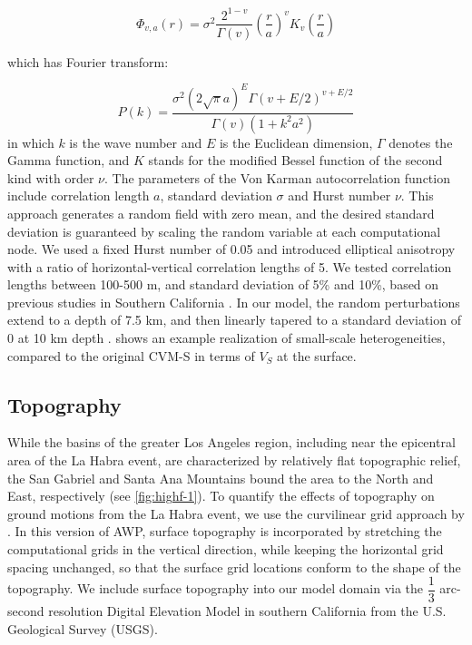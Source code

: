 \begin{equation}\label{eq:highf-1}
  \Phi_{v, a}(r)=\sigma^{2} \dfrac{2^{1-v}}{\Gamma(v)}\left(\dfrac{r}{a}\right)^{v} K_{v}\left(\dfrac{r}{a}\right)
\end{equation}

\noindent which has Fourier transform:

\begin{equation}\label{eq:highf-2}
  P(k)=\dfrac{\sigma^{2}(2 \sqrt{\pi} a)^{E} \Gamma(v+E / 2)^{v+E / 2}}{\Gamma(v)\left(1+k^{2} a^{2}\right)}
\end{equation}
\noindent in which $k$ is the wave number and $E$ is the Euclidean dimension, $\Gamma$ denotes the Gamma function, and $K$ stands for the modiﬁed Bessel function of the second kind with order $\nu$. The parameters of the Von Karman autocorrelation function include correlation length $a$, standard deviation $\sigma$ and Hurst number $\nu$. This approach generates a random field with zero mean, and the desired standard deviation is guaranteed by scaling the random variable at each computational node. We used a fixed Hurst number of 0.05 and introduced elliptical anisotropy with a ratio of horizontal-vertical correlation lengths of 5. We tested correlation lengths between 100-500 m, and standard deviation of 5\% and 10\%, based on previous studies in Southern California . In our model, the random perturbations extend to a depth of 7.5 km, and then linearly tapered to a standard deviation of 0 at 10 km depth \citep{olsen2018constraints}.  shows an example realization of small-scale heterogeneities, compared to the original CVM-S in terms of $V_S$ at the surface.

\subsection{Topography}
While the basins of the greater Los Angeles region, including near the epicentral area of the La Habra event, are characterized by relatively flat topographic relief, the San Gabriel and Santa Ana Mountains bound the area to the North and East, respectively (see \cref{fig:highf-1}). To quantify the effects of topography on ground motions from the La Habra event, we use the curvilinear grid approach by \citet{oreillyHighorderFiniteDifference2021}. In this version of AWP, surface topography is incorporated by stretching the computational grids in the vertical direction, while keeping the horizontal grid spacing unchanged, so that the surface grid locations conform to the shape of the topography. We include surface topography into our model domain via the $\dfrac{1}{3}$ arc-second resolution Digital Elevation Model in southern California from the U.S. Geological Survey (USGS).

